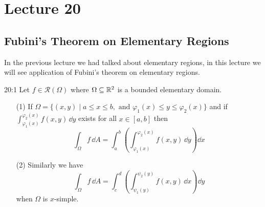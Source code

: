 \documentclass[../Analysis-3.tex]{subfiles}
\begin{document}
\chapter*{Lecture 20} %
\setcounter{chapter}{20} %
\setcounter{section}{0}

\section{Fubini's Theorem on Elementary Regions}

In the previous lecture we had talked about elementary regions, in this lecture we will see application of Fubini's theorem on elementary regions.

\begin{Thm}{}{20:1}
  Let $f \in \mathscr{R}(\Omega)$ where $\Omega \subseteq \mathbb{R}^2$ is a bounded elementary domain.
  \begin{enumerate}
    \item[(1)] If $\Omega = \{ (x,y) \mid a \leq x \leq b, \mbox{ and } \varphi_1(x) \leq y \leq \varphi_2(x) \}$ and if $\displaystyle{\int_{\varphi_1(x)}^{\varphi_2(x)}f(x,y) \, \dd
          y}$ exists for all $x \in [a,b]$ then
      \[
        \int_{\Omega} f \, \dd A = \int_a^b \left( \int_{\varphi_1(x)}^{\varphi_2(x)} f(x,y) \, \dd y\right) \dd x
      \]

    \item[(2)] Similarly we have
      \[
        \int_{\Omega} f \, \dd A = \int_c^d \left( \int_{\psi_1(y)}^{\psi_2(y)} f(x,y) \, \dd x\right) \dd y
      \]
      when $\Omega$ is $x$-simple.
  \end{enumerate}
\end{Thm}
\end{document}
